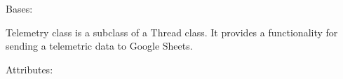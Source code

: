 \documentclass[letterpaper,10pt,english,openany]{sphinxmanual}
\begin{document}

\begin{fulllineitems}
\label{index:rpicameramon.telemetry.TelemetrySender}
Bases: 

Telemetry class is a subclass of a Thread class.
It provides a functionality for sending a telemetric data to
Google Sheets.

Attributes:

\begin{fulllineitems}
\label{index:rpicameramon.telemetry.TelemetrySender.run}
\end{fulllineitems}


\begin{fulllineitems}
\label{index:rpicameramon.telemetry.TelemetrySender.getTelemetry}
\end{fulllineitems}


\end{fulllineitems}




\renewcommand{\indexname}{Index}
\printindex
\end{document}
